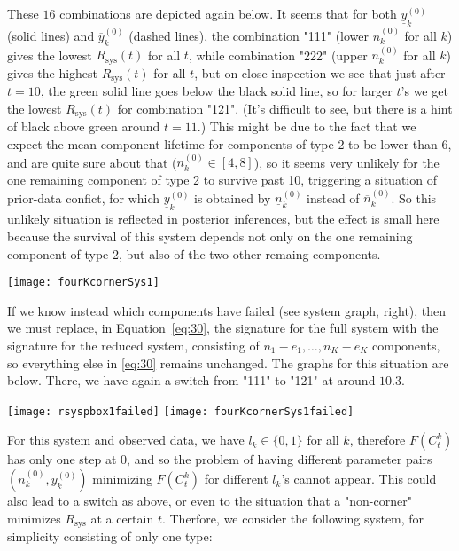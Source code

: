 \documentclass[12pt,a4paper,fleqn]{narms}
\newcommand{\uz}{^{(0)}} %
\newcommand{\ul}[1]{\underline{#1}}
\newcommand{\ol}[1]{\overline{#1}}
\newcommand{\Rsys}{R_\text{sys}}
\def\ykz{y\uz_k}
\def\ykzl{\ul{y}\uz_k}
\def\ykzu{\ol{y}\uz_k}
\def\nkz{n\uz_k}
\def\nkzl{\ul{n}\uz_k}
\def\nkzu{\ol{n}\uz_k}
\begin{document}
These $16$ combinations are depicted again below. It seems that for both $\ykzl$ (solid lines) and $\ykzu$ (dashed lines),
the combination "111" (lower $\nkz$ for all $k$) gives the lowest $\Rsys(t)$ for all $t$,
while combination "222" (upper $\nkz$ for all $k$) gives the highest $\Rsys(t)$ for all $t$,
but on close inspection we see that just after $t=10$, the green solid line goes below the
black solid line, so for larger $t$'s we get the lowest $\Rsys(t)$ for combination "121".
(It's difficult to see, but there is a hint of black above green around $t=11$.)
This might be due to the fact that we expect the mean component lifetime for components of type 2 to be lower than 6,
and are quite sure about that ($\nkz \in [4,8]$), so it seems very unlikely for the one remaining component of type 2
to survive past 10, triggering a situation of prior-data confict,
for which $\ykzl$ is obtained by $\nkzl$ instead of $\nkzu$.
So this unlikely situation is reflected in posterior inferences,
but the effect is small here because the survival of this system depends not only on the one remaining component of type 2,
but also of the two other remaing components.

\texttt{[image: fourKcornerSys1]}

If we know instead which components have failed (see system graph, right),
then we must replace, in Equation~\eqref{eq:30}, the signature for the full system with the signature for the reduced system,
consisting of $n_1-e_1, \ldots, n_K-e_K$ components, so everything else in \eqref{eq:30} remains unchanged.
The graphs for this situation are below. There, we have again a switch from "111" to "121" at around $10.3$.

\texttt{[image: rsyspbox1failed]}
\texttt{[image: fourKcornerSys1failed]}


For this system and observed data, we have $l_k \in \{0,1\}$ for all $k$,
therefore $F(C_t^k)$ has only one step at $0$,
and so the problem of having different parameter pairs $(\nkz,\ykz)$ minimizing $F(C_t^k)$ for different $l_k$'s cannot appear.
This could also lead to a switch as above,
or even to the situation that a "non-corner" minimizes $\Rsys$ at a certain $t$.
Therfore, we consider the following system,
for simplicity consisting of only one type:\\
\end{document}
